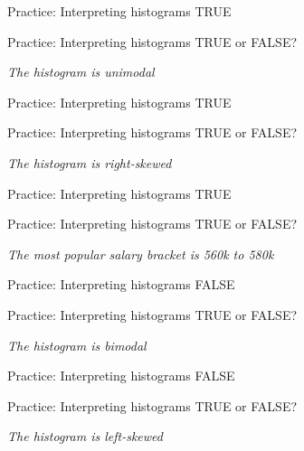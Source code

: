 \documentclass[
  ignorenonframetext,
]{beamer}
\begin{document}
\begin{frame}{Practice: Interpreting histograms}
\label{practice-interpreting-histograms-2}
TRUE
\end{frame}

\begin{frame}{Practice: Interpreting histograms}
\label{practice-interpreting-histograms-3}
TRUE or FALSE?

\emph{The histogram is unimodal}
\end{frame}

\begin{frame}{Practice: Interpreting histograms}
\label{practice-interpreting-histograms-4}
TRUE
\end{frame}

\begin{frame}{Practice: Interpreting histograms}
\label{practice-interpreting-histograms-5}
TRUE or FALSE?

\emph{The histogram is right-skewed}
\end{frame}

\begin{frame}{Practice: Interpreting histograms}
\label{practice-interpreting-histograms-6}
TRUE
\end{frame}

\begin{frame}{Practice: Interpreting histograms}
\label{practice-interpreting-histograms-7}
TRUE or FALSE?

\emph{The most popular salary bracket is 560k to 580k}
\end{frame}

\begin{frame}{Practice: Interpreting histograms}
\label{practice-interpreting-histograms-8}
FALSE
\end{frame}

\begin{frame}{Practice: Interpreting histograms}
\label{practice-interpreting-histograms-9}
TRUE or FALSE?

\emph{The histogram is bimodal}
\end{frame}

\begin{frame}{Practice: Interpreting histograms}
\label{practice-interpreting-histograms-10}
FALSE
\end{frame}

\begin{frame}{Practice: Interpreting histograms}
\label{practice-interpreting-histograms-11}
TRUE or FALSE?

\emph{The histogram is left-skewed}
\end{frame}
\end{document}
